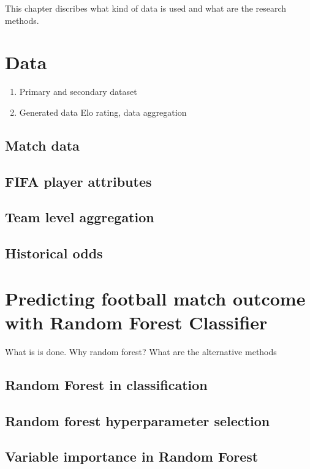 This chapter discribes what kind of data is used and what are the research methods.

\section{Data}
\begin{enumerate}
    \item Primary and secondary dataset
    \item Generated data
    Elo rating, data aggregation
\end{enumerate}
\subsection{Match data}
\subsection{FIFA player attributes}
\subsection{Team level aggregation}
\subsection{Historical odds}

\section{Predicting football match outcome with Random Forest Classifier}
What is is done. Why random forest? What are the alternative methods
\subsection{Random Forest in classification}
\subsection{Random forest hyperparameter selection}
\subsection{Variable importance in Random Forest}
